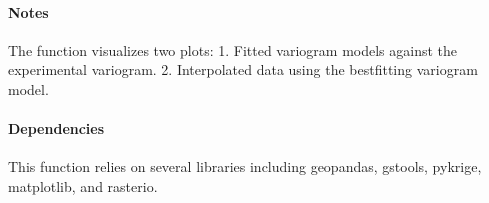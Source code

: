 \documentclass[letterpaper,10pt,english]{sphinxmanual}
\begin{document}
\begin{fulllineitems}
\paragraph{Notes}
\label{\detokenize{akhdefo_functions:id23}}
\sphinxAtStartPar
The function visualizes two plots:
1. Fitted variogram models against the experimental variogram.
2. Interpolated data using the best\sphinxhyphen{}fitting variogram model.


\paragraph{Dependencies}
\label{\detokenize{akhdefo_functions:dependencies}}
\sphinxAtStartPar
This function relies on several libraries including geopandas, gstools, pykrige, matplotlib, and rasterio.

\end{fulllineitems}

\end{document}
